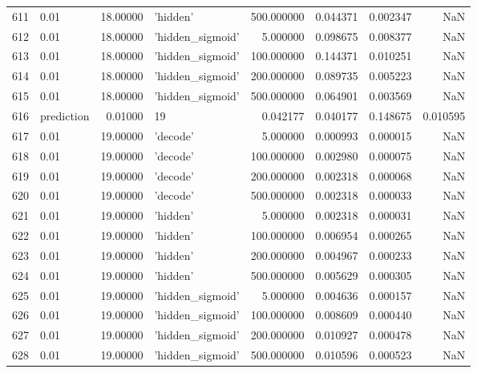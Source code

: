 \documentclass[10pt,a4paper]{article}
\begin{document}
\begin{tabular}{llrlrrrr}
611  &        0.01 &  18.00000 &           'hidden' &  500.000000 &  0.044371 &  0.002347 &       NaN \\
612  &        0.01 &  18.00000 &   'hidden\_sigmoid' &    5.000000 &  0.098675 &  0.008377 &       NaN \\
613  &        0.01 &  18.00000 &   'hidden\_sigmoid' &  100.000000 &  0.144371 &  0.010251 &       NaN \\
614  &        0.01 &  18.00000 &   'hidden\_sigmoid' &  200.000000 &  0.089735 &  0.005223 &       NaN \\
615  &        0.01 &  18.00000 &   'hidden\_sigmoid' &  500.000000 &  0.064901 &  0.003569 &       NaN \\
616  &  prediction &   0.01000 &                 19 &    0.042177 &  0.040177 &  0.148675 &  0.010595 \\
617  &        0.01 &  19.00000 &           'decode' &    5.000000 &  0.000993 &  0.000015 &       NaN \\
618  &        0.01 &  19.00000 &           'decode' &  100.000000 &  0.002980 &  0.000075 &       NaN \\
619  &        0.01 &  19.00000 &           'decode' &  200.000000 &  0.002318 &  0.000068 &       NaN \\
620  &        0.01 &  19.00000 &           'decode' &  500.000000 &  0.002318 &  0.000033 &       NaN \\
621  &        0.01 &  19.00000 &           'hidden' &    5.000000 &  0.002318 &  0.000031 &       NaN \\
622  &        0.01 &  19.00000 &           'hidden' &  100.000000 &  0.006954 &  0.000265 &       NaN \\
623  &        0.01 &  19.00000 &           'hidden' &  200.000000 &  0.004967 &  0.000233 &       NaN \\
624  &        0.01 &  19.00000 &           'hidden' &  500.000000 &  0.005629 &  0.000305 &       NaN \\
625  &        0.01 &  19.00000 &   'hidden\_sigmoid' &    5.000000 &  0.004636 &  0.000157 &       NaN \\
626  &        0.01 &  19.00000 &   'hidden\_sigmoid' &  100.000000 &  0.008609 &  0.000440 &       NaN \\
627  &        0.01 &  19.00000 &   'hidden\_sigmoid' &  200.000000 &  0.010927 &  0.000478 &       NaN \\
628  &        0.01 &  19.00000 &   'hidden\_sigmoid' &  500.000000 &  0.010596 &  0.000523 &       NaN \\

\end{tabular}
\end{document}
